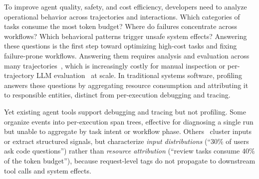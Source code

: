 \documentclass[sigconf,nonacm]{acmart}
\begin{document}
To improve agent quality, safety, and cost efficiency, developers
need to analyze operational behavior across trajectories and
interactions.
Which categories of tasks consume the most token budget? Where do
failures concentrate across workflows? Which behavioral patterns
trigger unsafe system effects?
Answering these questions is the first step toward optimizing high-cost tasks and fixing failure-prone workflows.
Answering them requires analysis and evaluation across many
trajectories~\cite{agentatlas,agentrewardbench}, which is increasingly costly for manual inspection or
per-trajectory LLM evaluation~\cite{llm-as-judge} at scale.
In traditional systems software, profiling answers these questions by
aggregating resource consumption and attributing it to responsible
entities, distinct from per-execution debugging and tracing.

Yet existing agent tools support debugging and tracing but not
profiling.
Some~\cite{langsmith,langfuse,phoenix,otel} organize events into
per-execution span trees, effective for diagnosing a single run but
unable to aggregate by task intent or workflow phase.
Others~\cite{datadog-llmobs,laminar-signals} cluster inputs or
extract structured signals, but characterize \emph{input
distributions} (``30\% of users ask code questions'') rather than
\emph{resource attribution} (``review tasks consume 40\% of the
token budget''), because request-level tags do not propagate
to downstream tool calls and system effects.
\end{document}
